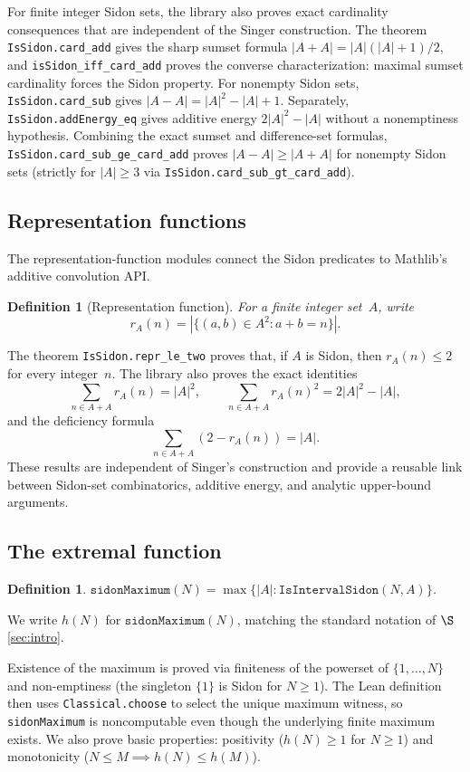 \documentclass[11pt,a4paper]{article}
\newtheorem{definition}[theorem]{Definition}
\begin{document}
For finite integer Sidon sets, the library also proves exact cardinality
consequences that are independent of the Singer construction.  The theorem
\texttt{IsSidon.card\_add} gives the sharp sumset formula
$|A+A|=|A|(|A|+1)/2$, and
\texttt{isSidon\_iff\_card\_add} proves the converse characterization:
maximal sumset cardinality forces the Sidon property.  For nonempty Sidon
sets, \texttt{IsSidon.card\_sub} gives
$|A-A|=|A|^2-|A|+1$.  Separately, \texttt{IsSidon.addEnergy\_eq} gives
additive energy $2|A|^2-|A|$ without a nonemptiness hypothesis.  Combining
the exact sumset and difference-set formulas, \texttt{IsSidon.card\_sub\_ge\_card\_add}
proves $|A-A|\ge |A+A|$ for nonempty Sidon sets (strictly for $|A|\ge 3$ via
\texttt{IsSidon.card\_sub\_gt\_card\_add}).

\subsection{Representation functions}

The representation-function modules connect the Sidon predicates to Mathlib's
additive convolution API.
\begin{definition}[Representation function]
For a finite integer set~$A$, write
\[
  r_A(n)=|\{(a,b)\in A^2 : a+b=n\}|.
\]
\end{definition}
The theorem \texttt{IsSidon.repr\_le\_two} proves that, if $A$ is Sidon, then
$r_A(n)\le2$ for every integer~$n$.  The library also proves the exact
identities
\[
  \sum_{n\in A+A} r_A(n)=|A|^2,\qquad
  \sum_{n\in A+A} r_A(n)^2=2|A|^2-|A|,
\]
and the deficiency formula
\[
  \sum_{n\in A+A} (2-r_A(n))=|A|.
\]
These results are independent of Singer's construction and provide a reusable
link between Sidon-set combinatorics, additive energy, and analytic
upper-bound arguments.

\subsection{The extremal function}

\begin{definition}
$\mathtt{sidonMaximum}(N) = \max\{|A| : \mathtt{IsIntervalSidon}(N, A)\}$.
\end{definition}

\noindent We write $h(N)$ for $\mathtt{sidonMaximum}(N)$, matching the standard
notation of $\S$\ref{sec:intro}.

Existence of the maximum is proved via finiteness of the powerset of
$\{1,\dots,N\}$ and non-emptiness (the singleton $\{1\}$ is Sidon for
$N \ge 1$).  The Lean definition then uses \texttt{Classical.choose} to select
the unique maximum witness, so \texttt{sidonMaximum} is noncomputable even
though the underlying finite maximum exists.  We also prove basic properties:
positivity ($h(N) \ge 1$
for $N \ge 1$) and monotonicity ($N \le M \implies h(N) \le h(M)$).
\end{document}
